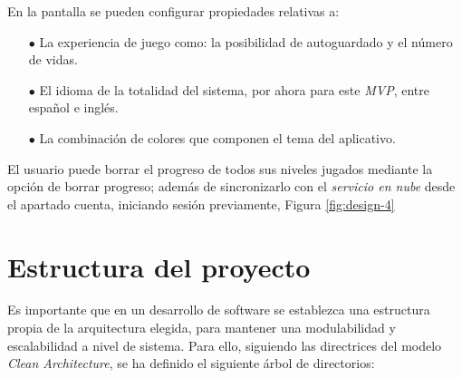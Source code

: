 En la pantalla se pueden configurar propiedades relativas a: 

\begin{itemize}
  \item[$\bullet$] La experiencia de juego como: la posibilidad de autoguardado y
  el número de vidas.
  \item[$\bullet$] El idioma de la totalidad del sistema, por ahora para este \textit{MVP}, entre español e inglés.
  \item[$\bullet$] La combinación de colores que componen el tema del aplicativo.
\end{itemize}

El usuario puede borrar el progreso de todos sus niveles jugados mediante la opción de borrar
progreso; además de sincronizarlo con el \textit{servicio en nube} desde el apartado cuenta, 
iniciando sesión previamente, Figura \ref{fig:design-4}

\section{Estructura del proyecto}
Es importante que en un desarrollo de software se establezca una estructura propia de la arquitectura elegida,
para mantener una modulabilidad y escalabilidad a nivel de sistema.
Para ello, siguiendo las directrices del modelo \textit{Clean Architecture}, se ha definido el siguiente
árbol de directorios:


